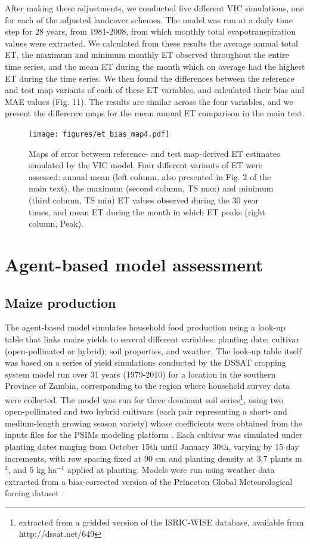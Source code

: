 \documentclass[11pt, titlepage]{article}
\begin{document}
After making these adjustments, we conducted five different VIC simulations, one for each of the adjusted landcover schemes. The model was run at a daily time step for 28 years, from 1981-2008, from which monthly total evapotranspiration values were extracted.  We calculated from these results the average annual total ET, the maximum and minimum monthly ET observed throughout the entire time series, and the mean ET during the month which on average had the highest ET during the time series. We then found the differences between the reference and test map variants of each of these ET variables, and calculated their bias and MAE values (Fig. 11). The results are similar across the four variables, and we present the difference maps for the mean annual ET comparison in the main text.  

\begin{figure}[ht]
  \centering
     \texttt{[image: figures/et\_bias\_map4.pdf]} 
      \caption{Maps of error between reference- and test map-derived ET estimates simulated by the VIC model. Four different variants of ET were assessed: annual mean (left column, also presented in Fig. 2 of the main text), the maximum (second column, TS max) and minimum (third column, TS min) ET values observed during the 30 year times, and mean ET during the month in which ET peaks (right column, Peak).}
      \label{fig:default}
\end{figure}


\section{\large Agent-based model assessment}

\subsection{\large Maize production}
The agent-based model simulates household food production using a look-up table that links maize yields to several different variables: planting date; cultivar (open-pollinated or hybrid); soil properties, and weather.  The look-up table itself was based on a series of yield simulations conducted by the DSSAT cropping system model run over 31 years (1979-2010) for a location in the southern Province of Zambia, corresponding to the region where household survey data were collected. The model was run for three dominant soil series\footnote{extracted from a gridded version of the ISRIC-WISE database, available from http://dssat.net/649}, using two open-pollinated and two hybrid cultivars (each pair representing a short- and medium-length growing season variety) whose coefficients were obtained from the inputs files for the PSIMs modeling platform \cite{elliott_parallel_2014}. Each cultivar was simulated under planting dates ranging from October 15th until January 30th, varying by 15 day increments, with row spacing fixed at 90 cm and planting density at 3.7 plants m$^2$, and 5 kg ha$^{-1}$ applied at planting. Models were run using weather data extracted from a bias-corrected version of the Princeton Global Meteorological forcing dataset \cite{sheffield_development_2006,chaney_spatial_2014,estes_changing_2014}.  
\end{document}
